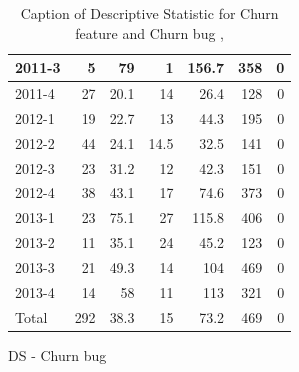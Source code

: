 \documentclass[UKenglish]{ifimaster}  %
\begin{document}
\begin{appendices}
\begin{table}[!htbp]
\begin{adjustwidth}{-1.5cm}{}
\begin{subfigure}[b]{0.3\textwidth}
{\begin{tabular}{ | l | r | r | r | r | r | r | }
 2011-3  & 5 & 79 & 1 & 156.7 & 358 & 0\\ \hline
 2011-4  & 27 & 20.1 & 14 & 26.4 & 128 & 0\\ \hline
 2012-1  & 19 & 22.7 & 13 & 44.3 & 195 & 0\\ \hline
 2012-2  & 44 & 24.1 & 14.5 & 32.5 & 141 & 0\\ \hline
 2012-3  & 23 & 31.2 & 12 & 42.3 & 151 & 0\\ \hline
 2012-4  & 38 & 43.1 & 17 & 74.6 & 373 & 0\\ \hline
 2013-1  & 23 & 75.1 & 27 & 115.8 & 406 & 0\\ \hline
 2013-2  & 11 & 35.1 & 24 & 45.2 & 123 & 0\\ \hline
 2013-3  & 21 & 49.3 & 14 & 104 & 469 & 0\\ \hline
 2013-4  & 14 & 58 & 11 & 113 & 321 & 0\\ \hline
 Total  & 292 & 38.3 & 15 & 73.2 & 469 & 0\\ \hline

\end{tabular}
}
\caption{DS - Churn bug}
 \label{DS:CB:10}
\end{subfigure}
\end{adjustwidth}
\caption[Optional caption for list of figures]{Caption of Descriptive Statistic for Churn feature and Churn bug  , }
\label{DS:10:4} %
\end{table}




\end{appendices}
\end{document}
